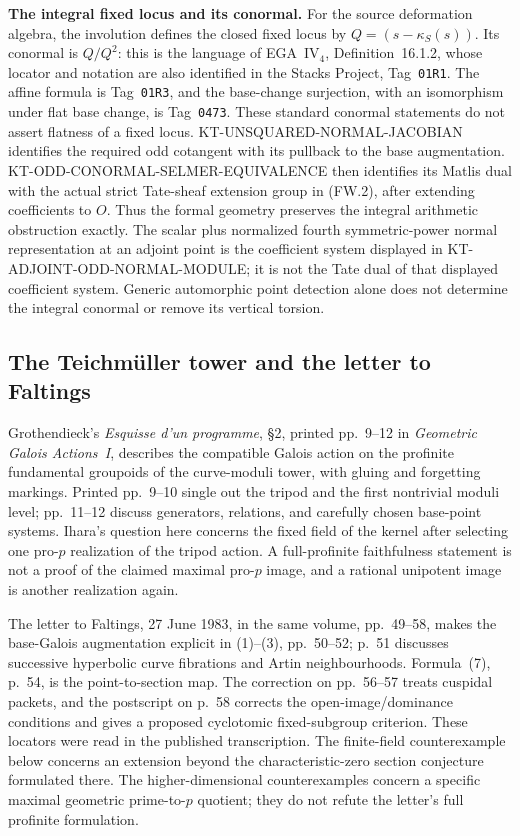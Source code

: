 \documentclass[11pt,a4paper]{article}
\theoremstyle{definition}
\renewcommand{\paragraph}[1]{\par\smallskip\noindent\textbf{#1}\quad\ignorespaces}
\begin{document}
\paragraph{The integral fixed locus and its conormal.}
For the source deformation algebra, the involution defines
the closed fixed locus by $Q=(s-\kappa_S(s))$.
Its conormal is $Q/Q^2$: this is the language of EGA~IV$_4$,
Definition~16.1.2, whose locator and notation are also identified
in the Stacks Project, Tag~\texttt{01R1}.  The affine formula
is Tag~\texttt{01R3}, and the base-change surjection, with an
isomorphism under flat base change, is Tag~\texttt{0473}.
These standard conormal statements do not assert flatness
of a fixed locus.  KT-UNSQUARED-NORMAL-JACOBIAN identifies
the required odd cotangent with its pullback to the base
augmentation.  KT-ODD-CONORMAL-SELMER-EQUIVALENCE then
identifies its Matlis dual with the actual strict Tate-sheaf
extension group in (FW.2), after extending coefficients to $O$.
Thus the formal geometry preserves the integral arithmetic
obstruction exactly.  The scalar plus normalized fourth
symmetric-power normal representation at an adjoint point
is the coefficient system displayed in KT-ADJOINT-ODD-NORMAL-MODULE;
it is not the Tate dual of that displayed coefficient system.
Generic automorphic point detection alone does not determine
the integral conormal or remove its vertical torsion.

\subsection{The Teichm\"uller tower and the letter to Faltings}

Grothendieck's \emph{Esquisse d'un programme}, \S2,
printed pp.~9--12 in \emph{Geometric Galois Actions~I},
describes the compatible Galois action on the profinite
fundamental groupoids of the curve-moduli tower, with gluing
and forgetting markings. Printed pp.~9--10 single out the
tripod and the first nontrivial moduli level; pp.~11--12
discuss generators, relations, and carefully chosen base-point
systems. Ihara's question here concerns the fixed field of
the kernel after selecting one pro-$p$ realization of the
tripod action. A full-profinite faithfulness statement is
not a proof of the claimed maximal pro-$p$ image, and a
rational unipotent image is another realization again.

The letter to Faltings, 27 June 1983, in the same volume,
pp.~49--58, makes the base-Galois augmentation explicit in
(1)--(3), pp.~50--52; p.~51 discusses successive hyperbolic
curve fibrations and Artin neighbourhoods. Formula~(7),
p.~54, is the point-to-section map. The correction on
pp.~56--57 treats cuspidal packets, and the postscript on
p.~58 corrects the open-image/dominance conditions and gives
a proposed cyclotomic fixed-subgroup criterion. These
locators were read in the published transcription.
The finite-field counterexample below concerns an extension
beyond the characteristic-zero section conjecture formulated
there. The higher-dimensional counterexamples concern a
specific maximal geometric prime-to-$p$ quotient; they do
not refute the letter's full profinite formulation.
\end{document}
